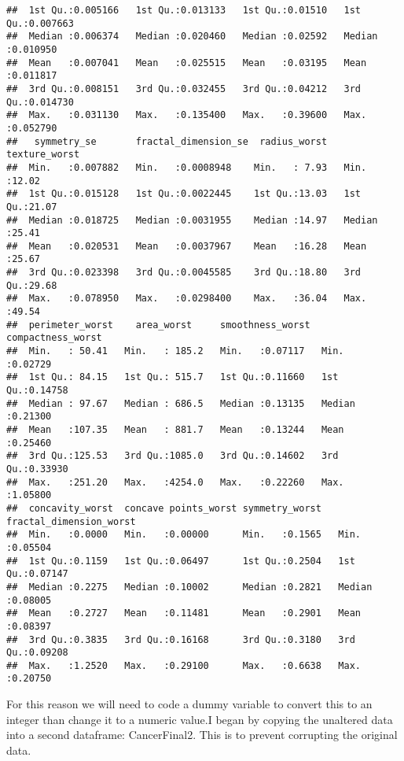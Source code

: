 \documentclass[
]{article}
\newenvironment{Shaded}{\begin{snugshade}}{\end{snugshade}}
\newcommand{\FunctionTok}[1]{\textcolor[rgb]{0.00,0.00,0.00}{#1}}
\newcommand{\NormalTok}[1]{#1}
\newcommand{\OtherTok}[1]{\textcolor[rgb]{0.56,0.35,0.01}{#1}}
\newcommand{\SpecialCharTok}[1]{\textcolor[rgb]{0.00,0.00,0.00}{#1}}
\begin{document}
\begin{verbatim}
##  1st Qu.:0.005166   1st Qu.:0.013133   1st Qu.:0.01510   1st Qu.:0.007663  
##  Median :0.006374   Median :0.020460   Median :0.02592   Median :0.010950  
##  Mean   :0.007041   Mean   :0.025515   Mean   :0.03195   Mean   :0.011817  
##  3rd Qu.:0.008151   3rd Qu.:0.032455   3rd Qu.:0.04212   3rd Qu.:0.014730  
##  Max.   :0.031130   Max.   :0.135400   Max.   :0.39600   Max.   :0.052790  
##   symmetry_se       fractal_dimension_se  radius_worst   texture_worst  
##  Min.   :0.007882   Min.   :0.0008948    Min.   : 7.93   Min.   :12.02  
##  1st Qu.:0.015128   1st Qu.:0.0022445    1st Qu.:13.03   1st Qu.:21.07  
##  Median :0.018725   Median :0.0031955    Median :14.97   Median :25.41  
##  Mean   :0.020531   Mean   :0.0037967    Mean   :16.28   Mean   :25.67  
##  3rd Qu.:0.023398   3rd Qu.:0.0045585    3rd Qu.:18.80   3rd Qu.:29.68  
##  Max.   :0.078950   Max.   :0.0298400    Max.   :36.04   Max.   :49.54  
##  perimeter_worst    area_worst     smoothness_worst  compactness_worst
##  Min.   : 50.41   Min.   : 185.2   Min.   :0.07117   Min.   :0.02729  
##  1st Qu.: 84.15   1st Qu.: 515.7   1st Qu.:0.11660   1st Qu.:0.14758  
##  Median : 97.67   Median : 686.5   Median :0.13135   Median :0.21300  
##  Mean   :107.35   Mean   : 881.7   Mean   :0.13244   Mean   :0.25460  
##  3rd Qu.:125.53   3rd Qu.:1085.0   3rd Qu.:0.14602   3rd Qu.:0.33930  
##  Max.   :251.20   Max.   :4254.0   Max.   :0.22260   Max.   :1.05800  
##  concavity_worst  concave points_worst symmetry_worst   fractal_dimension_worst
##  Min.   :0.0000   Min.   :0.00000      Min.   :0.1565   Min.   :0.05504        
##  1st Qu.:0.1159   1st Qu.:0.06497      1st Qu.:0.2504   1st Qu.:0.07147        
##  Median :0.2275   Median :0.10002      Median :0.2821   Median :0.08005        
##  Mean   :0.2727   Mean   :0.11481      Mean   :0.2901   Mean   :0.08397        
##  3rd Qu.:0.3835   3rd Qu.:0.16168      3rd Qu.:0.3180   3rd Qu.:0.09208        
##  Max.   :1.2520   Max.   :0.29100      Max.   :0.6638   Max.   :0.20750
\end{verbatim}

For this reason we will need to code a dummy variable to convert this to
an integer than change it to a numeric value.I began by copying the
unaltered data into a second dataframe: CancerFinal2. This is to prevent
corrupting the original data.

\begin{Shaded}
\end{Shaded}
\end{document}
